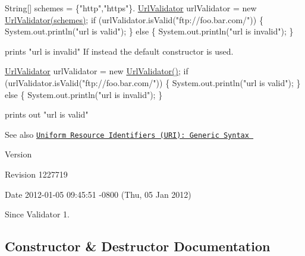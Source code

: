 \begin{DoxyPre}   String[] schemes = \{"http","https"\}.
   \hyperlink{classUrlValidator}{UrlValidator} urlValidator = new \hyperlink{classUrlValidator}{UrlValidator(schemes)};
   if (urlValidator.isValid("ftp://foo.bar.com/")) \{
      System.out.println("url is valid");
   \} else \{
      System.out.println("url is invalid");
   \}\end{DoxyPre}



\begin{DoxyPre}   prints "url is invalid"
  If instead the default constructor is used.\end{DoxyPre}



\begin{DoxyPre}   \hyperlink{classUrlValidator}{UrlValidator} urlValidator = new \hyperlink{classUrlValidator_aca1390e63674c0a23797c7cc06a30564}{UrlValidator()};
   if (urlValidator.isValid("ftp://foo.bar.com/")) \{
      System.out.println("url is valid");
   \} else \{
      System.out.println("url is invalid");
   \}\end{DoxyPre}



\begin{DoxyPre}  prints out "url is valid"
 \end{DoxyPre}


\begin{DoxySeeAlso}{See also}
\href{http://www.ietf.org/rfc/rfc2396.txt}{\tt Uniform Resource Identifiers (U\+RI)\+: Generic Syntax }
\end{DoxySeeAlso}
\begin{DoxyVersion}{Version}

\end{DoxyVersion}
\begin{DoxyParagraph}{Revision}
1227719 
\end{DoxyParagraph}
\begin{DoxyParagraph}{Date}
2012-\/01-\/05 09\+:45\+:51 -\/0800 (Thu, 05 Jan 2012) 
\end{DoxyParagraph}
\begin{DoxySince}{Since}
Validator 1. 
\end{DoxySince}


\subsection{Constructor \& Destructor Documentation}
